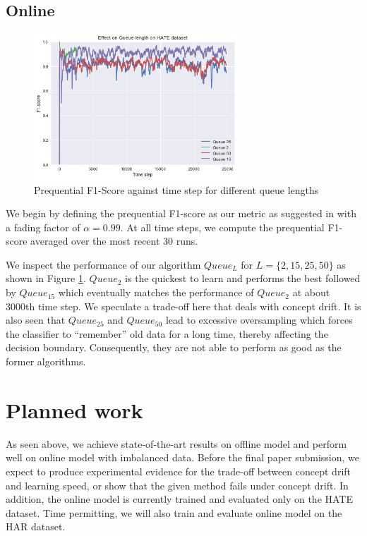 \documentclass{article}
\begin{document}
  \subsection{Online}
  \begin{figure}
    \begin{center}
    \includegraphics[width=3in]{Class_Imbalance_Result.png}
    \end{center}
    \caption{Prequential F1-Score against time step for different queue lengths}
    \label{fig:boat1}
  \end{figure}

  We begin by defining the prequential F1-score as our metric as suggested in \cite{Gama2012OnES}
  with a fading factor of \(\alpha=0.99\). At all time steps, we compute the prequential F1-score averaged over the most recent
  \(30\) runs.

  We inspect the performance of our algorithm \(Queue_L\) for \(L=\{2, 15, 25, 50\}\) as shown in Figure \ref{fig:boat1}. \(Queue_2\) is the quickest to learn and performs the best
  followed by \(Queue_{15}\) which eventually matches the performance
  of \(Queue_2\) at about 3000th time step. We speculate a trade-off here that deals with concept drift. It is also seen that
  \(Queue_{25}\) and \(Queue_{50}\) lead to excessive oversampling which forces the classifier to ``remember'' old data for a long time, thereby affecting
  the decision boundary. Consequently, they are not able to perform as good as the former algorithms.

  \section{Planned work}
  As seen above, we achieve state-of-the-art results on offline model and perform
  well on online model with imbalanced data. 
  Before the final paper submission, we expect to produce experimental evidence
  for the trade-off between concept drift and learning speed, or show that the given method fails under concept drift. 
  In addition, the online model is currently trained and evaluated only on the HATE dataset. Time permitting,
  we will also train and evaluate online model on the HAR dataset.

  
  

  
\end{document}
